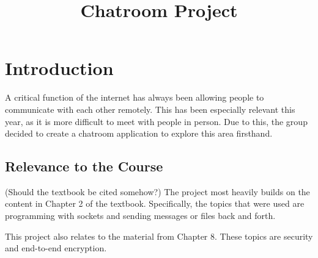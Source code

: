 \documentclass{article}
\begin{document}
\sloppy

\def\x{{\mathbf x}}
\def\L{{\cal L}}


\title{Chatroom Project}
%
\address{}


\maketitle


%
\begin{abstract}



\end{abstract}
%
%
\section{Introduction}
\label{sec:intro}
A critical function of the internet has always been allowing people to communicate with each other remotely. This has been especially relevant this year, as it is more difficult to meet with people in person. Due to this, the group decided to create a chatroom application to explore this area firsthand. 

\subsection{Relevance to the Course}

(Should the textbook be cited somehow?)
The project most heavily builds on the content in Chapter 2 of the textbook. Specifically, the topics that were used are programming with sockets and sending messages or files back and forth. 

This project also relates to the material from Chapter 8. These topics are security and end-to-end encryption. 
\end{document}
